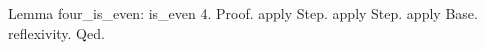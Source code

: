 Lemma four_is_even: 
   is_even 4.
Proof.
  apply Step. 
  apply Step.
  apply Base. 
  reflexivity.
Qed.